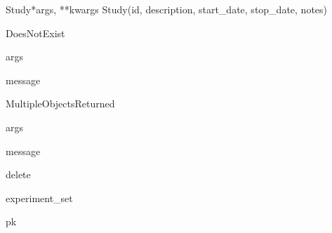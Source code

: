 \documentclass[letterpaper,10pt,english]{sphinxmanual}
\begin{document}
\hypertarget{data.models.Study}{}\begin{classdesc}{Study}{*args, **kwargs}
Study(id, description, start\_date, stop\_date, notes)

\hypertarget{data.models.Study.DoesNotExist}{}\begin{excdesc}{DoesNotExist}~

\hypertarget{data.models.Study.DoesNotExist.args}{}\begin{memberdesc}{args}\end{memberdesc}

\hypertarget{data.models.Study.DoesNotExist.message}{}\begin{memberdesc}{message}\end{memberdesc}
\end{excdesc}

\hypertarget{data.models.Study.MultipleObjectsReturned}{}\begin{excdesc}{MultipleObjectsReturned}~

\hypertarget{data.models.Study.MultipleObjectsReturned.args}{}\begin{memberdesc}{args}\end{memberdesc}

\hypertarget{data.models.Study.MultipleObjectsReturned.message}{}\begin{memberdesc}{message}\end{memberdesc}
\end{excdesc}

\hypertarget{data.models.Study.delete}{}\begin{methoddesc}[Study]{delete}{}\end{methoddesc}

\hypertarget{data.models.Study.experiment_set}{}\begin{memberdesc}[Study]{experiment\_set}\end{memberdesc}

\hypertarget{data.models.Study.pk}{}\begin{memberdesc}[Study]{pk}\end{memberdesc}


\end{classdesc}
\end{document}
